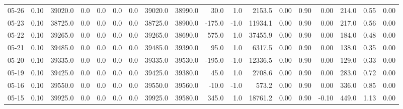 \begin{threeparttable}
{\begin{tabular}{lrrrrrrrrrrrrrrrrr}
  05-26 &     0.10 & 39020.0 &               0.0 &               0.0 &                0.0 &                0.0 & 39020.0 & 38990.0 &       30.0 &                      1.0 &              2153.5 &       0.00 &      0.90 &           0.00 &            214.0 &            0.55 &                   0.00 \\
  05-23 &     0.10 & 38725.0 &               0.0 &               0.0 &                0.0 &                0.0 & 38725.0 & 38900.0 &     -175.0 &                     -1.0 &             11934.1 &       0.00 &      0.90 &           0.00 &            217.0 &            0.56 &                   0.00 \\
  05-22 &     0.10 & 39265.0 &               0.0 &               0.0 &                0.0 &                0.0 & 39265.0 & 38690.0 &      575.0 &                      1.0 &             37455.9 &       0.00 &      0.90 &           0.00 &            184.0 &            0.48 &                   0.00 \\
  05-21 &     0.10 & 39485.0 &               0.0 &               0.0 &                0.0 &                0.0 & 39485.0 & 39390.0 &       95.0 &                      1.0 &              6317.5 &       0.00 &      0.90 &           0.00 &            138.0 &            0.35 &                   0.00 \\
  05-20 &     0.10 & 39335.0 &               0.0 &               0.0 &                0.0 &                0.0 & 39335.0 & 39530.0 &     -195.0 &                     -1.0 &             12336.5 &       0.00 &      0.90 &           0.00 &            129.0 &            0.33 &                   0.00 \\
  05-19 &     0.10 & 39425.0 &               0.0 &               0.0 &                0.0 &                0.0 & 39425.0 & 39380.0 &       45.0 &                      1.0 &              2708.6 &       0.00 &      0.90 &           0.00 &            283.0 &            0.72 &                   0.00 \\
  05-16 &     0.10 & 39550.0 &               0.0 &               0.0 &                0.0 &                0.0 & 39550.0 & 39560.0 &      -10.0 &                     -1.0 &               573.2 &       0.00 &      0.90 &           0.00 &            336.0 &            0.85 &                   0.00 \\
  05-15 &     0.10 & 39925.0 &               0.0 &               0.0 &                0.0 &                0.0 & 39925.0 & 39580.0 &      345.0 &                      1.0 &             18761.2 &       0.00 &      0.90 &          -0.10 &            449.0 &            1.13 &                   0.00 \\

\end{tabular}}
\end{threeparttable}
